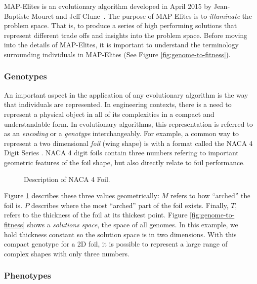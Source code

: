 \documentclass{sig-alternate}
\begin{document}
MAP-Elites is an evolutionary algorithm developed in April 2015 by Jean-Baptiste Mouret and Jeff Clune~\cite{Mouret:2015}.
The purpose of MAP-Elites is to \textit{illuminate} the problem space.
That is, to produce a series of high performing solutions that represent different trade offs and insights into the problem space.
Before moving into the details of MAP-Elites, it is important to understand the terminology surrounding individuals in MAP-Elites (See Figure \ref{fig:genome-to-fitness}).

\subsubsection{Genotypes}
\label{sec:genotypes}

An important aspect in the application of any evolutionary algorithm is the way that individuals are represented.
In engineering contexts, there is a need to represent a physical object in all of its complexities in a compact and understandable form.
In evolutionary algorithms, this representation is referred to as an \textit{encoding} or a \textit{genotype} interchangeably.
For example, a common way to represent a two dimensional \textit{foil} (wing shape) is with a format called the NACA 4 Digit Series \cite{wiki:NACAairfoil}.
NACA 4 digit foils contain three numbers refering to important geometric features of the foil shape, but also directly relate to foil performance.

\begin{figure}[htb]
\centering
{}
\caption{Description of NACA 4 Foil.}
\label{fig:NACA4}
\end{figure}

Figure \ref{fig:NACA4} describes these three values geometrically:
$M$ refers to how ``arched'' the foil is.
$P$ describes where the most ``arched'' part of the foil exists.
Finally, $T$, refers to the thickness of the foil at its thickest point. 
Figure \ref{fig:genome-to-fitness} shows a \textit{solutions space}, the space of all genomes.
In this example, we hold thickness constant so the solution space is in two dimensions.
With this compact genotype for a 2D foil, it is possible to represent a large range of complex shapes with only three numbers.

\subsubsection{Phenotypes}
\label{sec:phenotypes}
\end{document}
